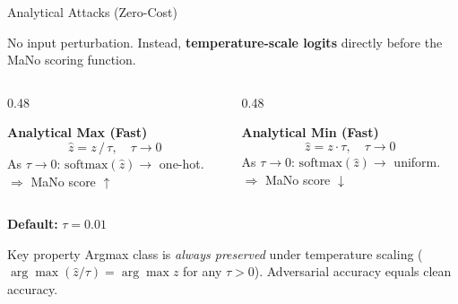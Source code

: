 \documentclass[aspectratio=169]{beamer}
\begin{document}
\begin{frame}{Analytical Attacks (Zero-Cost)}

No input perturbation. Instead, \textbf{temperature-scale logits}
directly before the MaNo scoring function.

\medskip
\begin{columns}[T]
\begin{column}{0.48\textwidth}
  \begin{block}{\textcolor{maxcolor}{\textbf{Analytical Max (Fast)}}}
    \[
      \hat{z} = z \,/\, \tau, \quad \tau \to 0
    \]
    As $\tau \to 0$: $\mathrm{softmax}(\hat{z}) \to$ one-hot.\\
    $\Rightarrow$ MaNo score $\uparrow$
  \end{block}
\end{column}
\hfill
\begin{column}{0.48\textwidth}
  \begin{block}{\textcolor{mincolor}{\textbf{Analytical Min (Fast)}}}
    \[
      \hat{z} = z \cdot \tau, \quad \tau \to 0
    \]
    As $\tau \to 0$: $\mathrm{softmax}(\hat{z}) \to$ uniform.\\
    $\Rightarrow$ MaNo score $\downarrow$
  \end{block}
\end{column}
\end{columns}

\medskip
\textbf{Default:} $\tau = 0.01$

\smallskip
\begin{alertblock}{Key property}
  Argmax class is \emph{always preserved} under temperature scaling
  ($\arg\max(\hat{z}/\tau) = \arg\max z$ for any $\tau > 0$).
  Adversarial accuracy equals clean accuracy.
\end{alertblock}

\end{frame}
\end{document}
